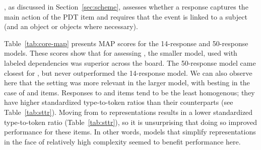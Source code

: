 , as discussed in Section~\ref{sec:scheme}, assesses whether a response captures the main action of the PDT item and requires that the event is linked to a subject (and an object or objects where necessary).

Table~\ref{tab:core-map} presents  MAP scores for the 14-response and 50-response  models. These scores show that for assessing , the smaller model, used with labeled dependencies was superior across the board. The 50-response model came closest for , but never outperformed the 14-response model. We can also observe here that the  setting was more relevant in the larger model, with  besting  in the case of  and  items. Responses to  and  items tend to  be the least homogenous; they have higher standardized type-to-token ratios than their counterparts (see Table~\ref{tab:sttr}). Moving from  to  representations results in a lower standardized type-to-token ratio (Table~\ref{tab:sttr}), so it is unsurprising that doing so improved performance for these items. In other words, models that simplify representations in the face of relatively high complexity seemed to benefit performance here.

